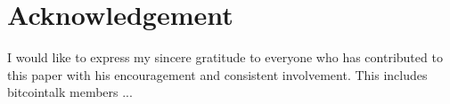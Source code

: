 \documentclass{sig-alternate}
\begin{document}
\section*{Acknowledgement}

I would like to express my sincere gratitude to everyone who has contributed to this paper with his encouragement and consistent involvement. This includes bitcointalk members ...



\end{document}

